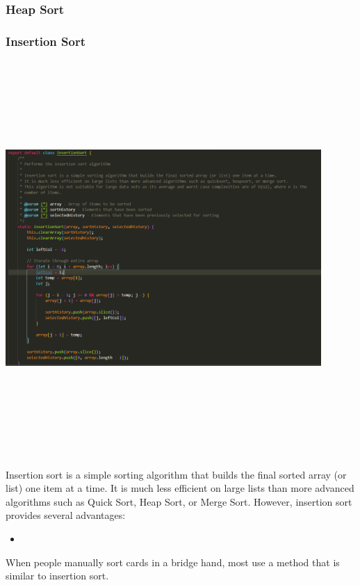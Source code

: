\subsubsection{Heap Sort}

\subsubsection{Insertion Sort}
\begin{center}
    \includegraphics[width=12cm,height=15cm,keepaspectratio]{images/insertionsort}
\end{center}
Insertion sort is a simple sorting algorithm that builds the final sorted array (or list) one item at a time. It is much less efficient on large lists than more advanced algorithms such as Quick Sort, Heap Sort, or Merge Sort. However, insertion sort provides several advantages:

\begin{itemize}
    \item 
\end{itemize}

When people manually sort cards in a bridge hand, most use a method that is similar to insertion sort.

